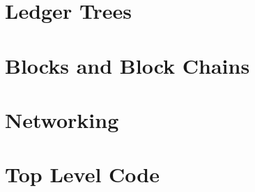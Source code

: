 \documentclass{book}
\begin{document}
\chapter{Ledger Trees}\label{chap:ctre}



\chapter{Blocks and Block Chains}\label{chap:block}



\chapter{Networking}\label{chap:net}



\chapter{Top Level Code}\label{chap:top}





\end{document}
